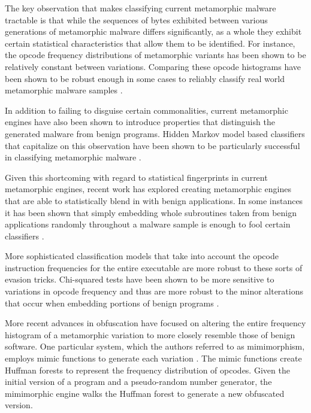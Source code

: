     The key observation that makes classifying current metamorphic malware
    tractable is that while the sequences of bytes exhibited between various
    generations of metamorphic malware differs significantly, as a whole they
    exhibit certain statistical characteristics that allow them to be
    identified. For instance, the opcode frequency distributions of metamorphic
    variants has been shown to be relatively constant between variations.
    Comparing these opcode histograms have been shown to be robust enough in
    some cases to reliably classify real world metamorphic malware samples
    \cite{histogram}.

    In addition to failing to disguise certain commonalities, current
    metamorphic engines have also been shown to introduce properties that
    distinguish the generated malware from benign programs.
    Hidden Markov model based classifiers that capitalize on this observation
    have been shown to be particularly successful in classifying metamorphic
    malware \cite{hmm_detect}.

    Given this shortcoming with regard to statistical fingerprints in current
    metamorphic engines, recent work has explored creating metamorphic engines
    that are able to statistically blend in with benign applications. In some
    instances it has been shown that simply embedding whole subroutines taken
    from benign applications randomly throughout a malware sample is enough to
    fool certain classifiers \cite{hmm_evade}.

    More sophisticated classification models that take into account the opcode
    instruction frequencies for the entire executable are more robust to these
    sorts of evasion tricks. Chi-squared tests have been shown to be more
    sensitive to variations in opcode frequency and thus are more robust to the
    minor alterations that occur when embedding portions of benign programs
    \cite{chisquared}.

    More recent advances in obfuscation have focused on altering the entire
    frequency histogram of a metamorphic variation to more closely resemble
    those of benign software. One particular system, which the authors referred
    to as mimimorphism, employs mimic functions to generate each variation
    \cite{mimimorph}. The mimic functions create Huffman forests to represent
    the frequency distribution of opcodes. Given the initial version of a
    program and a pseudo-random number generator, the mimimorphic engine walks
    the Huffman forest to generate a new obfuscated version.

